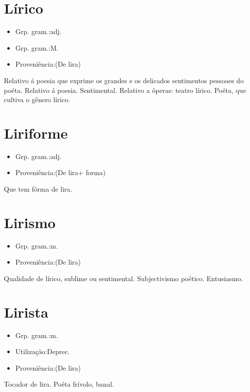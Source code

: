 \section{Lírico}
\begin{itemize}
\item {Grp. gram.:adj.}
\end{itemize}
\begin{itemize}
\item {Grp. gram.:M.}
\end{itemize}
\begin{itemize}
\item {Proveniência:(De \textunderscore lira\textunderscore )}
\end{itemize}
Relativo á poesia que exprime os grandes e os delicados sentimentos pessoaes do poéta.
Relativo á poesia.
Sentimental.
Relativo a óperas: \textunderscore teatro lírico\textunderscore .
Poéta, que cultiva o gênero lírico.
\section{Liriforme}
\begin{itemize}
\item {Grp. gram.:adj.}
\end{itemize}
\begin{itemize}
\item {Proveniência:(De \textunderscore lira\textunderscore  + \textunderscore forma\textunderscore )}
\end{itemize}
Que tem fórma de lira.
\section{Lirismo}
\begin{itemize}
\item {Grp. gram.:m.}
\end{itemize}
\begin{itemize}
\item {Proveniência:(De \textunderscore lira\textunderscore )}
\end{itemize}
Qualidade de lírico, sublime ou sentimental.
Subjectivismo poético.
Entusiasmo.
\section{Lirista}
\begin{itemize}
\item {Grp. gram.:m.}
\end{itemize}
\begin{itemize}
\item {Utilização:Deprec.}
\end{itemize}
\begin{itemize}
\item {Proveniência:(De \textunderscore lira\textunderscore )}
\end{itemize}
Tocador de lira.
Poéta frívolo, banal.
